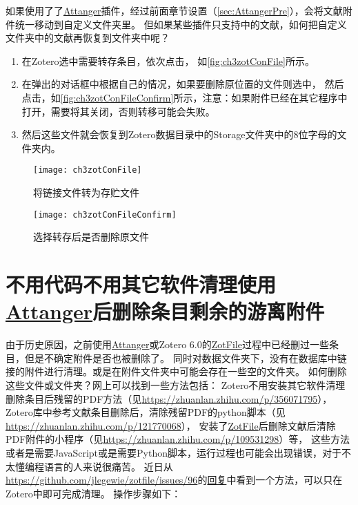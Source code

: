 \documentclass[theorem=false,mathfont=none,openany,sub3section]{easybook}
\begin{document}
如果使用了了\href{https://github.com/MuiseDestiny/zotero-attanger}{Attanger}插件，经过前面章节设置（\cref{sec:AttangerPre}），会将文献附件统一移动到自定义文件夹里。
但如果某些插件只支持中的文献，如何把自定义文件夹中的文献再恢复到文件夹中呢？

\begin{enumerate}
	\item 在Zotero选中需要转存条目，依次点击，
	如\autoref{fig:ch3zotConFile}所示。
	\item 在弹出的对话框中根据自己的情况，如果要删除原位置的文件则选中，
	然后点击，如\autoref{fig:ch3zotConFileConfirm}所示，注意：如果附件已经在其它程序中打开，需要将其关闭，否则转移可能会失败。
	\item 然后这些文件就会恢复到Zotero数据目录中的Storage文件夹中的8位字母的文件夹内。
\end{enumerate}

\begin{figure}[htbp]
	\centering
	\texttt{[image: ch3zotConFile]}
	\caption{将链接文件转为存贮文件}
	\label{fig:ch3zotConFile}
\end{figure}

\begin{figure}[htbp]
	\centering
	\texttt{[image: ch3zotConFileConfirm]}
	\caption{选择转存后是否删除原文件}
	\label{fig:ch3zotConFileConfirm}
\end{figure}

\section{不用代码不用其它软件清理使用\href{https://github.com/MuiseDestiny/zotero-attanger}{Attanger}后删除条目剩余的游离附件}\label{sec:zotFile_clean_att}

由于历史原因，之前使用\href{https://github.com/MuiseDestiny/zotero-attanger}{Attanger}或Zotero 6.0的\href{http://zotfile.com/}{ZotFile}过程中已经删过一些条目，但是不确定附件是否也被删除了。
同时对数据文件夹下，没有在数据库中链接的附件进行清理。或是在附件文件夹中可能会存在一些空的文件夹。
如何删除这些文件或文件夹？网上可以找到一些方法包括：
Zotero不用安装其它软件清理删除条目后残留的PDF方法（见\url{https://zhuanlan.zhihu.com/p/356071795}），
Zotero库中参考文献条目删除后，清除残留PDF的python脚本（见\url{https://zhuanlan.zhihu.com/p/121770068}），
安装了\href{http://zotfile.com/}{ZotFile}后删除文献后清除PDF附件的小程序（见\url{https://zhuanlan.zhihu.com/p/109531298}）等，
这些方法或者是需要JavaScript或是需要Python脚本，运行过程也可能会出现错误，对于不太懂编程语言的人来说很痛苦。
近日从\url{https://github.com/jlegewie/zotfile/issues/96}的\href{https://github.com/jlegewie/zotfile/issues/96#issuecomment-505084568}{回复}中看到一个方法，可以只在Zotero中即可完成清理。
操作步骤如下：
\end{document}
